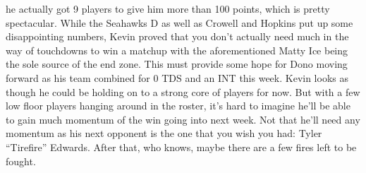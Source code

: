 \documentclass[11pt,letterpaper]{article}
\begin{document}
\par\noindent he actually got 9 players to give him more than 100 points, which is pretty spectacular. While the Seahawks D as well as Crowell and Hopkins put up some disappointing numbers, Kevin proved that you don't actually need much in the way of touchdowns to win a matchup with the aforementioned Matty Ice being the sole source of the end zone. This must provide some hope for Dono moving forward as his team combined for 0 TDS and an INT this week. Kevin looks as though he could be holding on to a strong core of players for now. But with a few low floor players hanging around in the roster, it's hard to imagine he'll be able to gain much momentum of the win going into next week. Not that he'll need any momentum as his next opponent is the one that you wish you had: Tyler ``Tirefire'' Edwards. After that, who knows, maybe there are a few fires left to be fought. 
\end{document}
